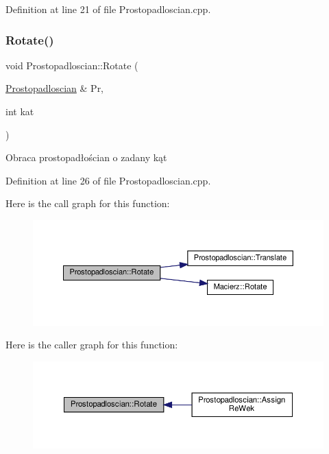 Definition at line 21 of file Prostopadloscian.\+cpp.

\mbox{\label{class_prostopadloscian_a3c00c5ac04367876833db20981e36a68}} 
\subsubsection{\texorpdfstring{Rotate()}{Rotate()}}
{\footnotesize\ttfamily void Prostopadloscian\+::\+Rotate (\begin{DoxyParamCaption}\item[{\hyperlink{class_prostopadloscian}{Prostopadloscian} \&}]{Pr,  }\item[{int}]{kat }\end{DoxyParamCaption})}

Obraca prostopadłościan o zadany kąt 

Definition at line 26 of file Prostopadloscian.\+cpp.

Here is the call graph for this function\+:
\nopagebreak
\begin{figure}[H]
\begin{center}
\leavevmode
\includegraphics[width=350pt]{class_prostopadloscian_a3c00c5ac04367876833db20981e36a68_cgraph}
\end{center}
\end{figure}
Here is the caller graph for this function\+:
\nopagebreak
\begin{figure}[H]
\begin{center}
\leavevmode
\includegraphics[width=350pt]{class_prostopadloscian_a3c00c5ac04367876833db20981e36a68_icgraph}
\end{center}
\end{figure}
\mbox{\label{class_prostopadloscian_a4b5870cc10216feaf8a23e8f9088e3ac}} 
